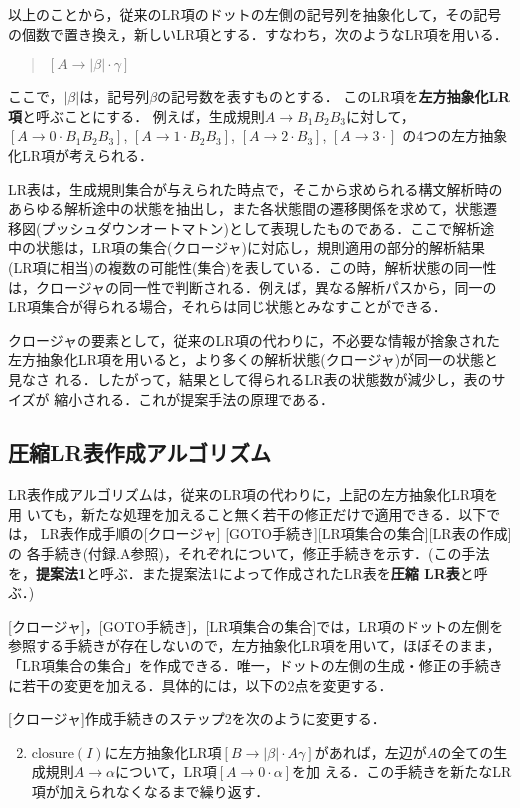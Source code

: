 以上のことから，従来のLR項のドットの左側の記号列を抽象化して，その記号
の個数で置き換え，新しいLR項とする．すなわち，次のようなLR項を用いる．
\begin{quote}
  $[ A \rightarrow |\beta| \cdot \gamma ]$
\end{quote}
ここで，$|\beta|$は，記号列$\beta$の記号数を表すものとする．
このLR項を{\bf 左方抽象化LR項}と呼ぶことにする．
例えば，生成規則$A \rightarrow B_1 B_2 B_3$に対して，
$[A \rightarrow 0 \cdot B_1 B_2 B_3]$, 
$[A \rightarrow 1 \cdot B_2 B_3]$,
$[A \rightarrow 2 \cdot B_3]$,
$[A \rightarrow 3 \cdot]$
の4つの左方抽象化LR項が考えられる．

LR表は，生成規則集合が与えられた時点で，そこから求められる構文解析時の
あらゆる解析途中の状態を抽出し，また各状態間の遷移関係を求めて，状態遷
移図(プッシュダウンオートマトン)として表現したものである．ここで解析途
中の状態は，LR項の集合(クロージャ)に対応し，規則適用の部分的解析結果
(LR項に相当)の複数の可能性(集合)を表している．この時，解析状態の同一性
は，クロージャの同一性で判断される．例えば，異なる解析パスから，同一の
LR項集合が得られる場合，それらは同じ状態とみなすことができる．

クロージャの要素として，従来のLR項の代わりに，不必要な情報が捨象された
左方抽象化LR項を用いると，より多くの解析状態(クロージャ)が同一の状態と見なさ
れる．したがって，結果として得られるLR表の状態数が減少し，表のサイズが
縮小される．これが提案手法の原理である．
\newpage
\subsection{圧縮LR表作成アルゴリズム}

LR表作成アルゴリズムは，従来のLR項の代わりに，上記の左方抽象化LR項を用
いても，新たな処理を加えること無く若干の修正だけで適用できる．以下では，
LR表作成手順の[クロージャ] [GOTO手続き][LR項集合の集合][LR表の作成]の
各手続き(付録.A参照)，それぞれについて，修正手続きを示す．(この手法
を，{\bf 提案法1}と呼ぶ．また提案法1によって作成されたLR表を{\bf  圧縮
  LR表}と呼ぶ．)

[クロージャ]，[GOTO手続き]，[LR項集合の集合]では，LR項のドットの左側を
参照する手続きが存在しないので，左方抽象化LR項を用いて，ほぼそのまま，
「LR項集合の集合」を作成できる．唯一，ドットの左側の生成・修正の手続き
に若干の変更を加える．具体的には，以下の2点を変更する．

[クロージャ]作成手続きのステップ2を次のように変更する．
\begin{enumerate}
\setcounter{enumi}{1}
\item $\mbox{closure}(I)$に左方抽象化LR項$[ B \rightarrow |\beta| \cdot A
  \gamma]$があれば，左辺が$A$の全ての生成規則$A \rightarrow
  \alpha$について，LR項$[ A \rightarrow 0 \cdot \alpha]$を加
  える．この手続きを新たなLR項が加えられなくなるまで繰り返す．
\end{enumerate}
  

